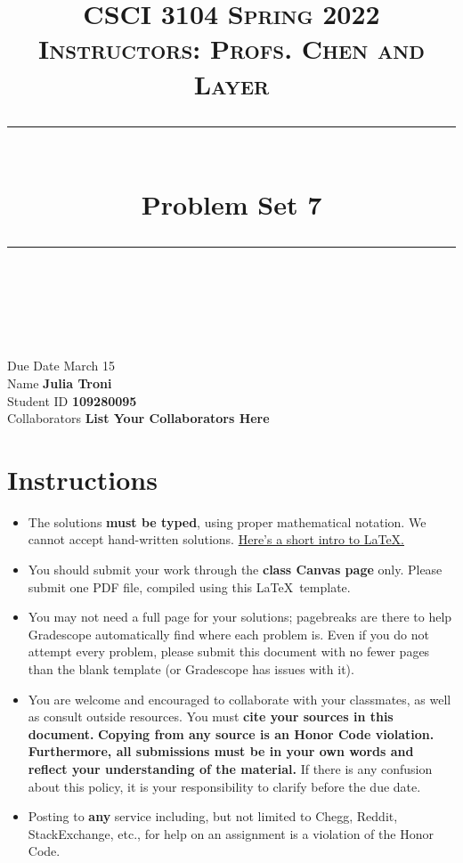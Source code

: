 \documentclass[11pt]{article}
\title{
\normalfont \normalsize 
\textsc{CSCI 3104 Spring 2022 \\ 
Instructors: Profs. Chen and Layer} \\
[10pt] 
\rule{\linewidth}{0.5pt} \\[6pt] 
\huge Problem Set 7\\
\rule{\linewidth}{2pt}  \\[10pt]
}
\date{}
\theoremstyle{definition}
\theoremstyle{definition}
\theoremstyle{definition}
\begin{document}
\maketitle


\noindent
Due Date \dotfill March 15 \\
Name \dotfill \textbf{Julia Troni} \\
Student ID \dotfill \textbf{109280095} \\
Collaborators \dotfill \textbf{List Your Collaborators Here}

\tableofcontents

\section{Instructions}
{\small
 \begin{itemize}
	\item The solutions \textbf{must be typed}, using proper mathematical notation. We cannot accept hand-written solutions. \href{http://ece.uprm.edu/~caceros/latex/introduction.pdf}{Here's a short intro to \LaTeX.}
	\item You should submit your work through the \textbf{class Canvas page} only. Please submit one PDF file, compiled using this \LaTeX \ template.
	\item You may not need a full page for your solutions; pagebreaks are there to help Gradescope automatically find where each problem is. Even if you do not attempt every problem, please submit this document with no fewer pages than the blank template (or Gradescope has issues with it).

	\item You are welcome and encouraged to collaborate with your classmates, as well as consult outside resources. You must \textbf{cite your sources in this document.} \textbf{Copying from any source is an Honor Code violation. Furthermore, all submissions must be in your own words and reflect your understanding of the material.} If there is any confusion about this policy, it is your responsibility to clarify before the due date. 

	\item Posting to \textbf{any} service including, but not limited to Chegg, Reddit, StackExchange, etc., for help on an assignment is a violation of the Honor Code.

\end{itemize}}
\end{document}
